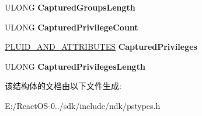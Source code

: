 \begin{DoxyCompactItemize}
U\+L\+O\+NG {\bfseries Captured\+Groups\+Length}
\item 
\mbox{\label{struct___p_s___j_o_b___t_o_k_e_n___f_i_l_t_e_r_ab8e9ff573aa2f2d8a34b4756d7eac078}} 
U\+L\+O\+NG {\bfseries Captured\+Privilege\+Count}
\item 
\mbox{\label{struct___p_s___j_o_b___t_o_k_e_n___f_i_l_t_e_r_adf7fb768c66f246c4d67e7aada1f9cda}} 
\hyperlink{struct___l_u_i_d___a_n_d___a_t_t_r_i_b_u_t_e_s}{P\+L\+U\+I\+D\+\_\+\+A\+N\+D\+\_\+\+A\+T\+T\+R\+I\+B\+U\+T\+ES} {\bfseries Captured\+Privileges}
\item 
\mbox{\label{struct___p_s___j_o_b___t_o_k_e_n___f_i_l_t_e_r_af6b81daa3c9e7e19de21e3923882576a}} 
U\+L\+O\+NG {\bfseries Captured\+Privileges\+Length}
\end{DoxyCompactItemize}


该结构体的文档由以下文件生成\+:\begin{DoxyCompactItemize}
\item 
E\+:/\+React\+O\+S-\/0../sdk/include/ndk/pstypes.\+h\end{DoxyCompactItemize}
